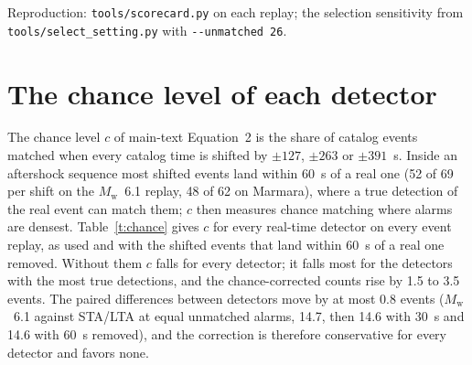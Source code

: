\documentclass[11pt,a4paper]{article}
\newcommand{\Mw}{$M_\mathrm{w}$}
\newcommand{\stalta}{STA/LTA}
\newcommand{\tool}[1]{\nolinkurl{#1}}
\begin{document}
\noindent Reproduction: \tool{tools/scorecard.py} on each replay; the selection
sensitivity from \tool{tools/select_setting.py} with \tool{--unmatched 26}.

\clearpage
\section{The chance level of each detector}\label{s:chance}

The chance level $c$ of main-text Equation~2 is the share of catalog events
matched when every catalog time is shifted by $\pm 127$, $\pm 263$ or $\pm 391$~s.
Inside an aftershock sequence most shifted events land within 60~s of a real one
(52 of 69 per shift on the \Mw{}~6.1 replay, 48 of 62 on Marmara), where a true
detection of the real event can match them; $c$ then measures chance matching where
alarms are densest. Table~\ref{t:chance} gives $c$ for every real-time detector on
every event replay, as used and with the shifted events that land within 60~s of a
real one removed. Without them $c$ falls for every detector; it falls most for the
detectors with the most true detections, and the chance-corrected counts rise by
1.5 to 3.5 events. The paired differences between detectors move by at most 0.8
events (\Mw{}~6.1 against \stalta{} at equal unmatched alarms, 14.7, then 14.6 with 30~s and 14.6 with 60~s removed), and the correction is therefore conservative for every
detector and favors none.
\end{document}
